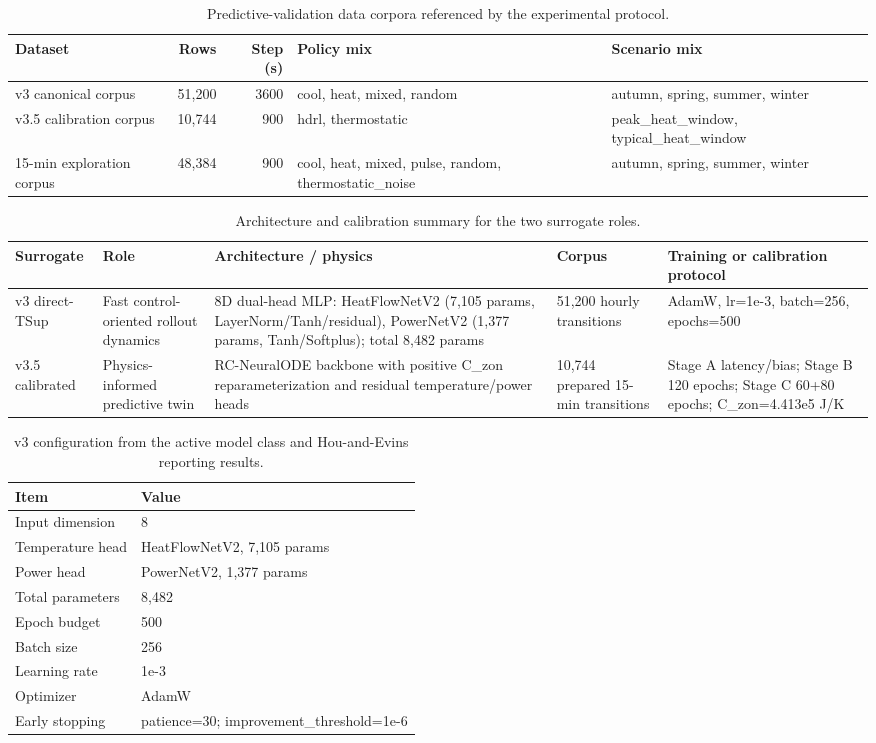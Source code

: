 \documentclass[11pt,a4paper]{article}
\begin{document}
\begin{table}[H]
\centering
\small
\caption{Predictive-validation data corpora referenced by the experimental protocol.}
\label{tab:block1-corpora}
\begin{tabularx}{\linewidth}{lrrXX}
\toprule
Dataset & Rows & Step (s) & Policy mix & Scenario mix \\
\midrule
v3 canonical corpus & 51,200 & 3600 & cool, heat, mixed, random & autumn, spring, summer, winter \\
v3.5 calibration corpus & 10,744 & 900 & hdrl, thermostatic & peak\_heat\_window, typical\_heat\_window \\
15-min exploration corpus & 48,384 & 900 & cool, heat, mixed, pulse, random, thermostatic\_noise & autumn, spring, summer, winter \\
\bottomrule
\end{tabularx}
\end{table}
\begin{table}[H]
\centering
\scriptsize
\caption{Architecture and calibration summary for the two surrogate roles.}
\label{tab:architecture-summary}
\begin{tabularx}{\linewidth}{lXXXX}
\toprule
Surrogate & Role & Architecture / physics & Corpus & Training or calibration protocol \\
\midrule
v3 direct-TSup & Fast control-oriented rollout dynamics & 8D dual-head MLP: HeatFlowNetV2 (7,105 params, LayerNorm/Tanh/residual), PowerNetV2 (1,377 params, Tanh/Softplus); total 8,482 params & 51,200 hourly transitions & AdamW, lr=1e-3, batch=256, epochs=500 \\
v3.5 calibrated & Physics-informed predictive twin & RC-NeuralODE backbone with positive C\_zon reparameterization and residual temperature/power heads & 10,744 prepared 15-min transitions & Stage A latency/bias; Stage B 120 epochs; Stage C 60+80 epochs; C\_zon=4.413e5 J/K \\
\bottomrule
\end{tabularx}
\end{table}
\begin{table}[H]
\centering
\small
\caption{v3 configuration from the active model class and Hou-and-Evins reporting results.}
\label{tab:v3-config}
\begin{tabularx}{0.86\linewidth}{lX}
\toprule
Item & Value \\
\midrule
Input dimension & 8 \\
Temperature head & HeatFlowNetV2, 7,105 params \\
Power head & PowerNetV2, 1,377 params \\
Total parameters & 8,482 \\
Epoch budget & 500 \\
Batch size & 256 \\
Learning rate & 1e-3 \\
Optimizer & AdamW \\
Early stopping & patience=30; improvement\_threshold=1e-6 \\
\bottomrule
\end{tabularx}
\end{table}
\end{document}
